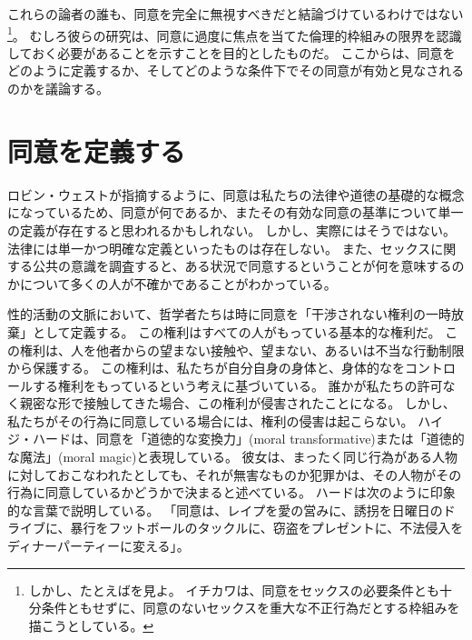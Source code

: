 \documentclass[paper=a4,book,openany]{jlreq}
\newcommand{\ig}[1]{}           %
\begin{document}
これらの論者の誰も、同意を完全に無視すべきだと結論づけているわけではない\footnote{しかし、たとえば\citet{ichikawa20:_presup_consen}を見よ。
イチカワは、同意をセックスの必要条件とも十分条件ともせずに、同意のないセックスを重大な不正行為だとする枠組みを描こうとしている。
\nocite{ichikawa20:_presup_consen}}。
むしろ彼らの研究は、同意に過度に焦点を当てた倫理的枠組みの限界を認識しておく必要があることを示すことを目的としたものだ。
ここからは、同意をどのように定義するか、そしてどのような条件下でその同意が有効と見なされるのかを議論する。

\section{同意を定義する}

ロビン・ウェスト\ig{Robin West}が指摘するように、同意は私たちの法律や道徳の基礎的な概念になっているため、同意が何であるか、またその有効な同意の基準について単一の定義が存在すると思われるかもしれない。
しかし、実際にはそうではない。
法律には単一かつ明確な定義といったものは存在しない。
また、セックスに関する公共の意識を調査すると、ある状況で同意するということが何を意味するのかについて多くの人が不確かであることがわかっている\citep[pp. 462-463]{muehlenhard16:_compl_sexual_consen_colleg_studen}。

性的活動の文脈において、哲学者たちは時に同意を「干渉されない権利の一時放棄」として定義する。
この権利はすべての人がもっている基本的な権利だ。
この権利は、人を他者からの望まない接触や、望まない、あるいは不当な行動制限から保護する。
この権利は、私たちが自分自身の身体と、身体的なをコントロールする権利をもっているという考えに基づいている。
誰かが私たちの許可なく親密な形で接触してきた場合、この権利が侵害されたことになる。
しかし、私たちがその行為に同意している場合には、権利の侵害は起こらない。
ハイジ・ハードは、同意を「道徳的な変換力」(moral transformative)または「道徳的な魔法」(moral magic)と表現している。
彼女は、まったく同じ行為がある人物に対しておこなわれたとしても、それが無害なものか犯罪かは、その人物がその行為に同意しているかどうかで決まると述べている。
ハード\ig{Hurd}は次のように印象的な言葉で説明している。
「同意は、レイプを愛の営みに、誘拐を日曜日のドライブに、暴行をフットボールのタックルに、窃盗をプレゼントに、不法侵入をディナーパーティーに変える」\citep[pp. 503-504]{hurd05:_blamin_victim}。
\end{document}
